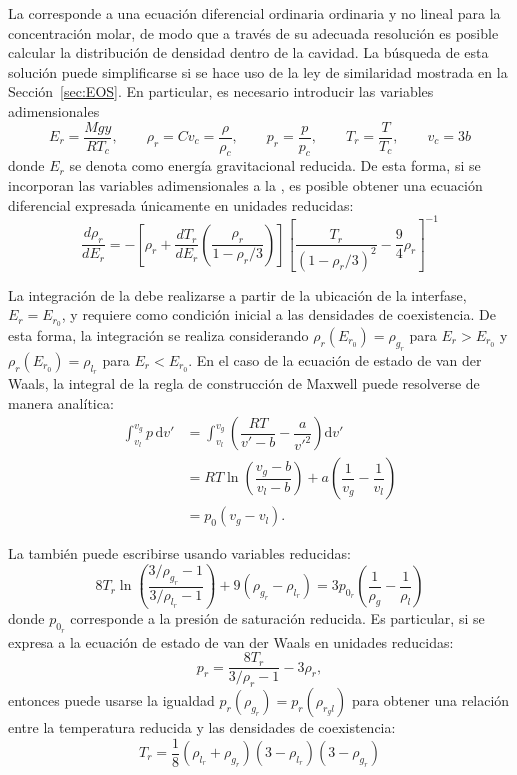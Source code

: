La  corresponde a una ecuaci\'on diferencial ordinaria ordinaria y no lineal para la concentraci\'on molar, de modo que a trav\'es de su adecuada resoluci\'on es posible calcular la distribuci\'on de densidad dentro de la cavidad. 
La b\'usqueda de esta soluci\'on puede simplificarse si se hace uso de la ley de similaridad mostrada en la Secci\'on~\ref{sec:EOS}. En particular, es necesario introducir las variables adimensionales
\begin{equation}
	E_r = \dfrac{Mgy}{RT_c}, \qquad \rho_r=Cv_c=\dfrac{\rho}{\rho_c}, \qquad p_r=\dfrac{p}{p_c}, \qquad T_r = \dfrac{T}{T_c}, \qquad v_c = 3b
\end{equation}
donde $E_r$ se denota como energ\'ia gravitacional reducida. De esta forma, si se incorporan las variables adimensionales a la , es posible obtener una ecuaci\'on diferencial expresada \'unicamente en unidades reducidas:
\begin{equation}
	\dfrac{d\rho_r}{dE_r} = -\left[ \rho_r + \dfrac{dT_r}{dE_r} \left( \dfrac{\rho_r}{1-\rho_r/3} \right) \right]
\left[ \dfrac{T_r}{(1-\rho_r/3)^2} -\dfrac{9}{4}\rho_r \right]^{-1}
	\label{eq:vdw_column_red}
\end{equation}

La integraci\'on de la  debe realizarse a partir de la ubicaci\'on de la interfase, $E_r = E_{r_0}$, y requiere como condici\'on inicial a las densidades de coexistencia. De esta forma, la integraci\'on se realiza considerando $\rho_r(E_{r_0}) = \rho_{g_r}$ para $E_r > E_{r_0}$ y $\rho_r(E_{r_0}) = \rho_{l_r}$ para $E_r < E_{r_0}$. En el caso de la ecuaci\'on de  estado de van der Waals, la integral de la regla de construcci\'on de Maxwell puede resolverse de manera anal\'itica:
\begin{align}
	\int_{v_l}^{v_g} p \, \mbox{d}v' &= \int_{v_l}^{v_g} \left( \dfrac{RT}{v'-b} - \dfrac{a}{v'^2} \right) \mbox{d}v'	\\
		&= RT \ln \left( \dfrac{v_g - b}{v_l-b} \right) + a\left( \dfrac{1}{v_g} - \dfrac{1}{v_l} \right) \\
		&= p_0(v_g-v_l).
		\label{eq:vdw_maxwell_analitica}
\end{align}

La  tambi\'en puede escribirse usando variables reducidas:
\begin{equation}
	8T_r \ln \left( \dfrac{3/\rho_{g_r}-1}{3/\rho_{l_r}-1} \right) + 9(\rho_{g_r} - \rho_{l_r}) = 3p_{0_r} \left( \dfrac{1}{\rho_g} - \dfrac{1}{\rho_l} \right)
\end{equation}
donde $p_{0_r}$ corresponde a la presi\'on de saturaci\'on reducida. Es particular, si se expresa a la ecuaci\'on de estado de van der Waals en unidades reducidas:
\begin{equation}
 p_r = \dfrac{8 T_r}{3/\rho_r-1} - 3\rho_r,
\end{equation}
entonces puede usarse la igualdad $p_r(\rho_{g_r}) = p_r(\rho_{r_gl})$ para obtener una relaci\'on entre la temperatura reducida y las densidades de coexistencia:
\begin{equation}
	T_r = \dfrac{1}{8}(\rho_{l_r}+\rho_{g_r})(3-\rho_{l_r})(3-\rho_{g_r})
	\label{eq:tr_maxwell}
\end{equation}

